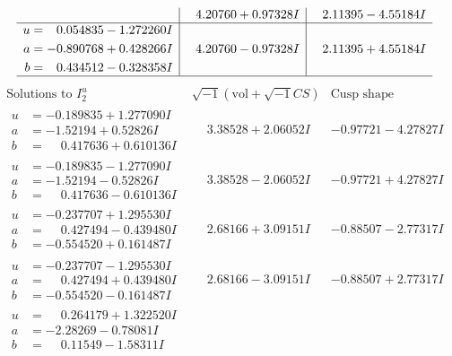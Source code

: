 \documentclass[1p]{elsarticle_modified}
\theoremstyle{definition}
\newcommand{\I}{\sqrt{-1}}
\begin{document}
$$\begin{array}{c|c|c}
 & \phantom{-}4.20760 + 0.97328 I & \phantom{-}2.11395 - 4.55184 I \\ \hline\begin{aligned}
u &= \phantom{-}0.054835 - 1.272260 I \\
a &= -0.890768 + 0.428266 I \\
b &= \phantom{-}0.434512 - 0.328358 I\end{aligned}
 & \phantom{-}4.20760 - 0.97328 I & \phantom{-}2.11395 + 4.55184 I\\
 \hline 
 \end{array}$$\newpage$$\begin{array}{c|c|c}  
\text{Solutions to }I^u_{2}& \I (\text{vol} + \sqrt{-1}CS) & \text{Cusp shape}\\
 \hline 
\begin{aligned}
u &= -0.189835 + 1.277090 I \\
a &= -1.52194 + 0.52826 I \\
b &= \phantom{-}0.417636 + 0.610136 I\end{aligned}
 & \phantom{-}3.38528 + 2.06052 I & -0.97721 - 4.27827 I \\ \hline\begin{aligned}
u &= -0.189835 - 1.277090 I \\
a &= -1.52194 - 0.52826 I \\
b &= \phantom{-}0.417636 - 0.610136 I\end{aligned}
 & \phantom{-}3.38528 - 2.06052 I & -0.97721 + 4.27827 I \\ \hline\begin{aligned}
u &= -0.237707 + 1.295530 I \\
a &= \phantom{-}0.427494 - 0.439480 I \\
b &= -0.554520 + 0.161487 I\end{aligned}
 & \phantom{-}2.68166 + 3.09151 I & -0.88507 - 2.77317 I \\ \hline\begin{aligned}
u &= -0.237707 - 1.295530 I \\
a &= \phantom{-}0.427494 + 0.439480 I \\
b &= -0.554520 - 0.161487 I\end{aligned}
 & \phantom{-}2.68166 - 3.09151 I & -0.88507 + 2.77317 I \\ \hline\begin{aligned}
u &= \phantom{-}0.264179 + 1.322520 I \\
a &= -2.28269 - 0.78081 I \\
b &= \phantom{-}0.11549 - 1.58311 I\end{aligned}

\end{array}$$
\end{document}
